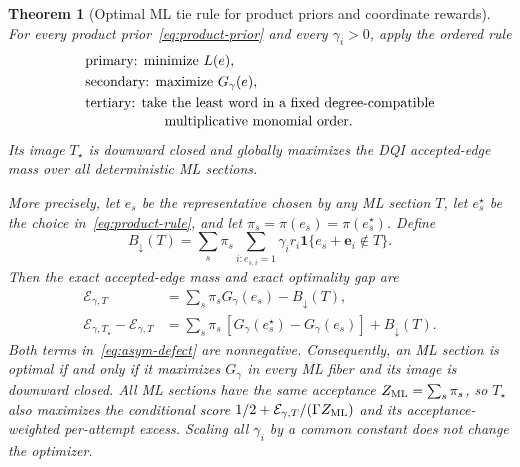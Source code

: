 \documentclass[journal]{IEEEtran}
\newtheorem{theorem}{Theorem}
\theoremstyle{definition}
\theoremstyle{remark}
\newcommand{\ind}{\mathbf 1}
\begin{document}
\begin{theorem}[Optimal ML tie rule for product priors and coordinate rewards]
\label{thm:asymmetric-optimum}
For every product prior~\eqref{eq:product-prior} and every $\gamma_i>0$, apply
the ordered rule
\begin{align}
 &\text{primary: minimize }L(e),\nonumber\\
 &\text{secondary: maximize }G_\gamma(e),\nonumber\\
 &\text{tertiary: take the least word in a fixed degree-compatible}
 \nonumber\\[-0.2em]
 &\hspace{5.7em}\text{multiplicative monomial order}.
 \label{eq:product-rule}
\end{align}
Its image $T_\star$ is downward closed and globally maximizes the DQI
accepted-edge mass over all deterministic ML sections.

More precisely, let $e_s$ be the representative chosen by any ML section
$T$, let $e_s^\star$ be the choice in~\eqref{eq:product-rule}, and let
$\pi_s=\pi(e_s)=\pi(e_s^\star)$.  Define
\begin{equation}
 B_\downarrow(T)=\sum_s\pi_s\sum_{i:e_{s,i}=1}\gamma_i r_i
 \ind\{e_s+\mathbf e_i\notin T\}.
 \label{eq:asym-boundary}
\end{equation}
Then the exact accepted-edge mass and exact optimality gap are
\begin{align}
 \mathcal E_{\gamma,T}
 &=\sum_s\pi_sG_\gamma(e_s)-B_\downarrow(T),
 \label{eq:asym-edge}\\
 \mathcal E_{\gamma,T_\star}-\mathcal E_{\gamma,T}
 &=\sum_s\pi_s\,[G_\gamma(e_s^\star)-G_\gamma(e_s)]
   +B_\downarrow(T).
 \label{eq:asym-defect}
\end{align}
 Both terms in~\eqref{eq:asym-defect} are nonnegative.  Consequently, an ML
 section is optimal if and only if it maximizes $G_\gamma$ in every ML fiber
 and its image is downward closed.  All ML sections have
the same acceptance $Z_{\rm ML}=\sum_s\pi_s$, so $T_\star$ also maximizes the
conditional score $1/2+\mathcal E_{\gamma,T}/(\Gamma Z_{\rm ML})$ and its
acceptance-weighted per-attempt excess.  Scaling all $\gamma_i$ by a common
constant does not change the optimizer.
\end{theorem}
\end{document}
